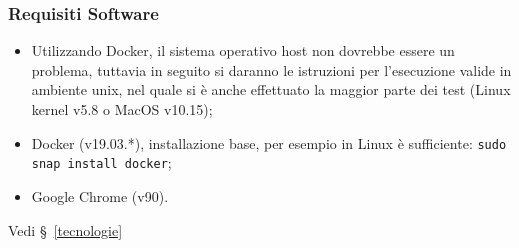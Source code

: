 \subsubsection{Requisiti Software}
	\begin{comment}
        \pparagraph{Librerie}
        \begin{itemize}
        \item express (v4.17.1);
        \item http (v0.0.1-security);
        \item mocha (v8.3.2);
        \item net (v1.0.2);
        \item primeicons (v4.1.0);
        \item primeng (v11.3.2);
        \item rxjs (v6.6.0);
        \item socket.io (v3.1.2);
        \item spring boot (v2.4.5).
        \end{itemize}
    \end{comment}

    \begin{itemize}
   		\item Utilizzando Docker, il sistema operativo host non dovrebbe essere un problema, tuttavia in seguito si daranno le istruzioni per l'esecuzione valide in ambiente unix, nel quale si è anche effettuato la maggior parte dei test (Linux kernel v5.8 o MacOS v10.15);
        \item Docker (v19.03.*), installazione base, per esempio in Linux è sufficiente: \texttt{sudo snap install docker};
        \item Google Chrome (v90).
    \end{itemize}

    Vedi \S\ \ref{tecnologie}

    \begin{comment}
    	\item Client:
    \begin{itemize}
    	\item Docker.

    \end{itemize}
    	\item Server:
    \begin{itemize}
    	\item Docker.

    \end{itemize}
    \end{comment}








